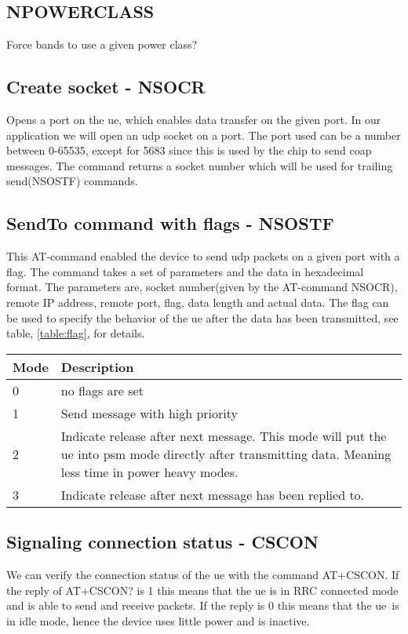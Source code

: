 \documentclass[USenglish]{ifimaster}  %
\begin{document}
\subsection{NPOWERCLASS}
Force bands to use a given power class?

\subsection{Create socket - NSOCR}
Opens a port on the \acrshort{ue}, which enables data transfer on the given port. In our application we will open an \acrshort{udp} socket on a port. The port used can be a number between 0-65535, except for 5683 since this is used by the chip to send coap messages. The command returns a socket number which will be used for trailing send(NSOSTF) commands.

\subsection{SendTo command with flags - NSOSTF}
This AT-command enabled the device to send \acrshort{udp} packets on a given port with a flag. The command takes a set of parameters and the data in hexadecimal format. The parameters are, socket number(given by the AT-command NSOCR), remote IP address, remote port, flag, data length and actual data. The flag can be used to specify the behavior of the \acrshort{ue} after the data has been transmitted, see table, \vref{table:flag}, for details.

\begin{center} \label{table:flag}
  \begin{tabular}{ | l | m{10cm} | }
    \hline
    Mode & Description \\
    \hline
    0 & no flags are set \\
    \hline
    1 & Send message with high priority \\
    \hline
    2 & Indicate release after next message. This mode will put the \acrshort{ue} into \acrshort{psm} mode directly after transmitting data. Meaning less time in power heavy modes. \\
    \hline
    3 & Indicate release after next message has been replied to. \\
    \hline
  \end{tabular}
\end{center}

\subsection{Signaling connection status - CSCON}
We can verify the connection status of the \acrshort{ue} with the command AT+CSCON. If the reply of AT+CSCON? is 1 this means that the \acrshort{ue} is in RRC connected mode and is able to send and receive packets. If the reply is 0 this means that the \acrshort{ue} is in idle mode, hence the device uses little power and is inactive.
\end{document}
